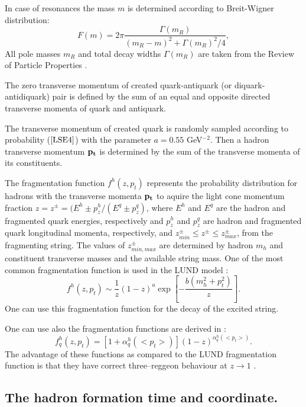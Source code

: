In case of resonances the mass $m$ is determined according to
Breit-Wigner distribution:
\begin{equation}
\label{LSD3} F(m) = 2\pi\frac{\Gamma(m_R)}{(m_R - m)^2 + \Gamma(m_R)^2/4},
\end{equation}
All pole masses $m_R$ and total decay widths $\Gamma(m_R)$ are taken
from the Review of Particle Properties \cite{PDG96}. 

 The zero transverse
momentum of created quark-antiquark (or diquark-antidiquark) pair is
defined by the sum of an equal and opposite directed transverse momenta
of quark and antiquark.

The transverse momentum of created quark is randomly sampled according
to probability ($\ref{LSE4}$) 
with the parameter $a = 0.55$ GeV$^{-2}$. Then a hadron transverse momentum
${\bf p_t}$ is determined by the sum of the transverse momenta of its
constituents.

The fragmentation function $f^h(z,p_t)$ represents the probability
distribution for hadrons with the transverse momenta $\bf{p_t}$ to
aquire the light cone momentum fraction 
$z=z^{\pm}=(E^h \pm p^h_z/(E^q \pm p^q_z)$, where $E^h$ and $E^q$ are 
the hadron and fragmented quark energies, respectively 
and $p^h_z$ and $p^q_z$ are hadron and fragmented quark longitudinal momenta, 
respectively, 
and $z^{\pm}_{min} \leq z^{\pm} \leq z^{\pm}_{max}$, from the
fragmenting string. The values of $z^{\pm}_{min,max}$ are determined by
hadron $m_h$ and constituent transverse masses and the available string
mass. One of the most common fragmentation function is  used in
the LUND model \cite{LUND83}:
\begin{equation}
\label{LSD5} f^h (z, p_t) \sim \frac{1}{z}(1-z)^a
\exp{[-\frac{b(m_h^2+p_t^2)}{z}]}.
\end{equation}
One can use this fragmentation function for the decay of the excited 
string.

One can use also the fragmentation functions are derived in \cite{Kai87}:
\begin{equation}
\label{LSD6} f^{h}_q (z, p_t)=[1+\alpha^h_q(<p_t>)] (1-z)^{\alpha^h_q(<p_t>)}.
\end{equation}
The advantage of these functions as compared to the LUND fragmentation
function is that they have correct three--reggeon behaviour at
$z\rightarrow 1$ \cite{Kai87}.

\subsection{The hadron formation time and coordinate.}

